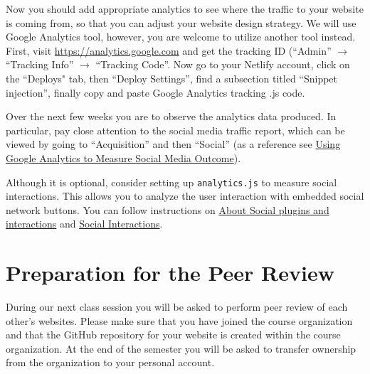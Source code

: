 \documentclass[11pt]{article}
\begin{document}
Now you should add appropriate analytics to see where the traffic  to your website is coming from, so that you can adjust your website design strategy. We will use Google Analytics tool, however, you are welcome to utilize another tool instead. First, visit \href{Google Analytics site}{https://analytics.google.com} and get the tracking ID (``Admin'' $\rightarrow$ ``Tracking Info'' $\rightarrow$ ``Tracking Code''. Now go to your Netlify account, click on the ``Deploys" tab, then ``Deploy Settings'', find a subsection titled ``Snippet injection'', finally copy and paste Google Analytics tracking .js code. 

Over the next few weeks you are to observe the analytics data produced. In particular, pay close attention to the social media traffic report, which can be viewed by going to ``Acquisition'' and then ``Social'' (as a reference see \href{https://www.linkedin.com/pulse/using-google-analytics-measure-social-media-outcome-priyanka-gupta/}{Using Google Analytics to Measure Social Media Outcome}).

Although it is optional,  consider setting up {\tt analytics.js} to measure social interactions. This allows you to analyze the user interaction with embedded social network buttons. You can follow instructions on \href{https://support.google.com/analytics/answer/6209874}{About Social plugins and interactions} and \href{https://developers.google.com/analytics/devguides/collection/analyticsjs/social-interactions}{Social Interactions}.




\vspace{-0.05in}
\section*{Preparation for the Peer Review}

During our next class session you will be asked to perform peer review of each other's websites. Please make sure  that you have joined the course organization and that the GitHub repository for your website is created within the course organization. At the end of the semester you will be asked to transfer ownership from the organization to your personal account.  
\end{document}
